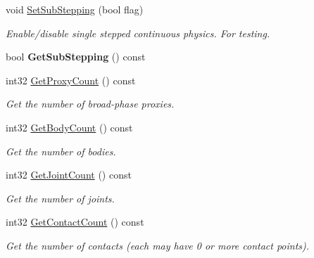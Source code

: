 \begin{DoxyCompactItemize}
\mbox{\label{classb2_world_ae8aacc78ea4753075067daff51b61778}} 
void \hyperlink{classb2_world_ae8aacc78ea4753075067daff51b61778}{Set\+Sub\+Stepping} (bool flag)
\begin{DoxyCompactList}\small\item\em Enable/disable single stepped continuous physics. For testing. \end{DoxyCompactList}\item 
\mbox{\label{classb2_world_aa41f23e3e12f82ce229ce644ecdac28b}} 
bool {\bfseries Get\+Sub\+Stepping} () const
\item 
\mbox{\label{classb2_world_a088742d580bfc42531790ea8747bb8f8}} 
int32 \hyperlink{classb2_world_a088742d580bfc42531790ea8747bb8f8}{Get\+Proxy\+Count} () const
\begin{DoxyCompactList}\small\item\em Get the number of broad-\/phase proxies. \end{DoxyCompactList}\item 
\mbox{\label{classb2_world_a41c8b37baf5165c06932e8f08eb758de}} 
int32 \hyperlink{classb2_world_a41c8b37baf5165c06932e8f08eb758de}{Get\+Body\+Count} () const
\begin{DoxyCompactList}\small\item\em Get the number of bodies. \end{DoxyCompactList}\item 
\mbox{\label{classb2_world_a98bd6ca53dbc376f210beced33901934}} 
int32 \hyperlink{classb2_world_a98bd6ca53dbc376f210beced33901934}{Get\+Joint\+Count} () const
\begin{DoxyCompactList}\small\item\em Get the number of joints. \end{DoxyCompactList}\item 
\mbox{\label{classb2_world_aa47375fc3ca9f09d0350c61cfeabcee9}} 
int32 \hyperlink{classb2_world_aa47375fc3ca9f09d0350c61cfeabcee9}{Get\+Contact\+Count} () const
\begin{DoxyCompactList}\small\item\em Get the number of contacts (each may have 0 or more contact points). \end{DoxyCompactList}\item 

\end{DoxyCompactItemize}
